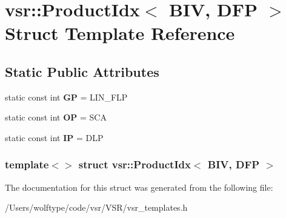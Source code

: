 \hypertarget{structvsr_1_1_product_idx_3_01_b_i_v_00_01_d_f_p_01_4}{\section{vsr\-:\-:Product\-Idx$<$ B\-I\-V, D\-F\-P $>$ Struct Template Reference}
\label{structvsr_1_1_product_idx_3_01_b_i_v_00_01_d_f_p_01_4}
}
\subsection*{Static Public Attributes}
\begin{DoxyCompactItemize}
\item 
\hypertarget{structvsr_1_1_product_idx_3_01_b_i_v_00_01_d_f_p_01_4_a1238fd92869483779d037a566ea3228c}{static const int {\bfseries G\-P} = L\-I\-N\-\_\-\-F\-L\-P}\label{structvsr_1_1_product_idx_3_01_b_i_v_00_01_d_f_p_01_4_a1238fd92869483779d037a566ea3228c}

\item 
\hypertarget{structvsr_1_1_product_idx_3_01_b_i_v_00_01_d_f_p_01_4_abb45d1c87821b011cf1ed3465202bf66}{static const int {\bfseries O\-P} = S\-C\-A}\label{structvsr_1_1_product_idx_3_01_b_i_v_00_01_d_f_p_01_4_abb45d1c87821b011cf1ed3465202bf66}

\item 
\hypertarget{structvsr_1_1_product_idx_3_01_b_i_v_00_01_d_f_p_01_4_abdb5fe5e3dd92bf366335e43f58e313e}{static const int {\bfseries I\-P} = D\-L\-P}\label{structvsr_1_1_product_idx_3_01_b_i_v_00_01_d_f_p_01_4_abdb5fe5e3dd92bf366335e43f58e313e}

\end{DoxyCompactItemize}
\subsubsection*{template$<$$>$ struct vsr\-::\-Product\-Idx$<$ B\-I\-V, D\-F\-P $>$}



The documentation for this struct was generated from the following file\-:\begin{DoxyCompactItemize}
\item 
/\-Users/wolftype/code/vsr/\-V\-S\-R/vsr\-\_\-templates.\-h\end{DoxyCompactItemize}
